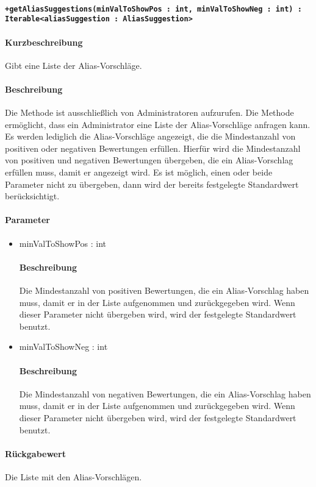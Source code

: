 \paragraph*{\texttt{+getAliasSuggestions(minValToShowPos : int, minValToShowNeg : int) : Iterable<aliasSuggestion : AliasSuggestion>}}%
\paragraph*{Kurzbeschreibung}
Gibt eine Liste der Alias-Vorschläge.
\paragraph*{Beschreibung}
Die Methode ist ausschließlich von Administratoren aufzurufen.
Die Methode ermöglicht, dass ein Administrator eine Liste der Alias-Vorschläge anfragen kann.
Es werden lediglich die Alias-Vorschläge angezeigt, die die Mindestanzahl von positiven oder negativen Bewertungen erfüllen.
Hierfür wird die Mindestanzahl von positiven und negativen Bewertungen übergeben, die ein Alias-Vorschlag erfüllen muss, damit er angezeigt wird.
Es ist möglich, einen oder beide Parameter nicht zu übergeben, dann wird der bereits festgelegte Standardwert berücksichtigt.
\paragraph*{Parameter}
\begin{itemize}
	\item minValToShowPos : int
		\paragraph*{Beschreibung}
		Die Mindestanzahl von positiven Bewertungen, die ein Alias-Vorschlag haben muss, damit er in der Liste aufgenommen und zurückgegeben wird.
		Wenn dieser Parameter nicht übergeben wird, wird der festgelegte Standardwert benutzt.
	\item minValToShowNeg : int
		\paragraph*{Beschreibung}
		Die Mindestanzahl von negativen Bewertungen, die ein Alias-Vorschlag haben muss, damit er in der Liste aufgenommen und zurückgegeben wird. 
		Wenn dieser Parameter nicht übergeben wird, wird der festgelegte Standardwert benutzt.
\end{itemize}
\paragraph*{Rückgabewert}
Die Liste mit den Alias-Vorschlägen. 
